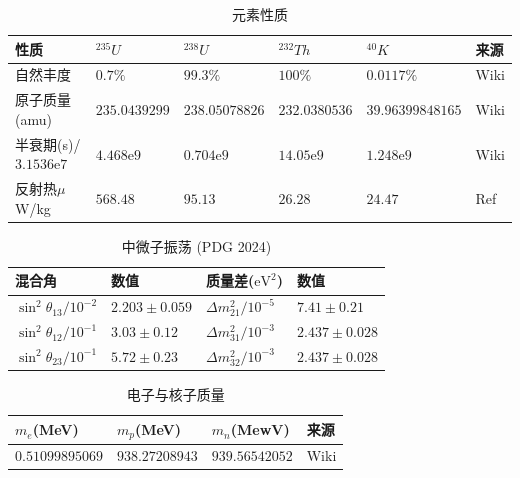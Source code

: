				\begin{table}[H]
					\centering
					\caption{元素性质}
					\begin{tabular}{p{3.5cm}|p{2cm}p{2cm}p{2cm}p{3cm}|p{2cm}}
						\hline
						\hline
						性质 & ${}^{235}U$ & ${}^{238}U$ & ${}^{232}Th$ & ${}^{40}K$ & 来源\\
						\hline
						自然丰度 & $0.7\%$ & $99.3\%$ & $100\%$ & $0.0117\%$ & Wiki\\
						\hline
						原子质量(amu) & $235.0439299$& $238.05078826$ & $232.0380536$ & $39.96399848165$ & Wiki \\
						\hline
						半衰期(s)/$3.1536$e$7$ & $4.468$e$9$ & $0.704$e$9$ & $14.05$e$9$ & $1.248$e$9$ & Wiki \\
						\hline
						反射热$\mu$W/kg & $568.48$ & $95.13$ & $26.28$ & $24.47$ & Ref \cite{dye2012geoneutrinos}\\
						\hline
						\hline
					\end{tabular}
					\label{Table: Element Properties}
				\end{table}
				\begin{table}[H]
					\centering
					\caption{中微子振荡 (PDG 2024)}
					\begin{tabular}{p{2cm}|p{3cm}|p{3cm}|p{3cm}}
						\hline
						\hline
						混合角 & 数值 & 质量差($\text{eV}^2$) & 数值\\
						\hline
						$\sin^2 \theta_{13}/10^{-2}$ & $2.203\pm 0.059$ & $\Delta m_{21}^2/10^{-5}$ & $7.41\pm 0.21$\\
						\hline
						$\sin^2 \theta_{12}/10^{-1}$ & $3.03\pm 0.12$ & $\Delta m_{31}^2/10^{-3}$ & $2.437\pm 0.028$\\
						\hline
						$\sin^2 \theta_{23}/10^{-1}$ & $5.72\pm 0.23$ & $\Delta m_{32}^2/10^{-3}$ & $2.437\pm 0.028$\\
						\hline
						\hline
					\end{tabular}
					\label{Table: Oscillation Parameters}
				\end{table}
				\begin{table}[H]
					\centering
					\caption{电子与核子质量}
					\begin{tabular}{p{3cm}p{3cm}p{3cm}|p{3cm}}
						\hline
						\hline
						$m_e$(MeV) & $m_p$(MeV) & $m_n$(MewV) & 来源\\
						\hline
						$0.51099895069$ & $938.27208943$ & $939.56542052$ & Wiki\\
						\hline
						\hline
					\end{tabular}
					\label{Table: Electron and Nucleon Mass}
				\end{table}
